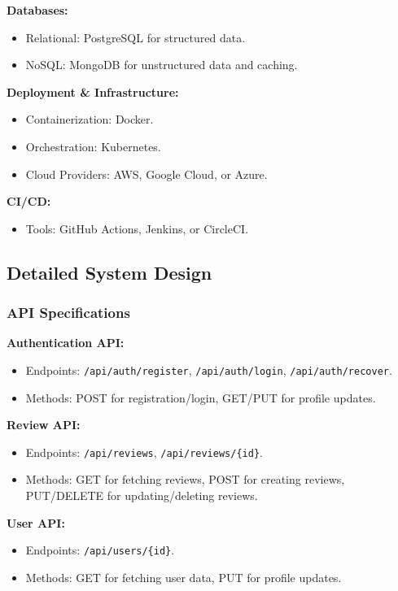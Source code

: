 \documentclass[11pt]{article}
\begin{document}
\textbf{Databases:}
\begin{itemize}[noitemsep]
    \item Relational: PostgreSQL for structured data.
    \item NoSQL: MongoDB for unstructured data and caching.
\end{itemize}

\textbf{Deployment \& Infrastructure:}
\begin{itemize}[noitemsep]
    \item Containerization: Docker.
    \item Orchestration: Kubernetes.
    \item Cloud Providers: AWS, Google Cloud, or Azure.
\end{itemize}

\textbf{CI/CD:}
\begin{itemize}[noitemsep]
    \item Tools: GitHub Actions, Jenkins, or CircleCI.
\end{itemize}

\subsection{Detailed System Design}
\subsubsection{API Specifications}
\textbf{Authentication API:}
\begin{itemize}[noitemsep]
    \item Endpoints: \texttt{/api/auth/register}, \texttt{/api/auth/login}, \texttt{/api/auth/recover}.
    \item Methods: POST for registration/login, GET/PUT for profile updates.
\end{itemize}

\textbf{Review API:}
\begin{itemize}[noitemsep]
    \item Endpoints: \texttt{/api/reviews}, \texttt{/api/reviews/\{id\}}.
    \item Methods: GET for fetching reviews, POST for creating reviews, PUT/DELETE for updating/deleting reviews.
\end{itemize}

\textbf{User API:}
\begin{itemize}[noitemsep]
    \item Endpoints: \texttt{/api/users/\{id\}}.
    \item Methods: GET for fetching user data, PUT for profile updates.
\end{itemize}
\end{document}
